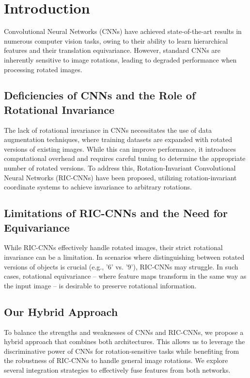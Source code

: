 \section{Introduction}
\label{sec:intro}

Convolutional Neural Networks (CNNs) have achieved state-of-the-art results in numerous computer vision tasks, owing to their ability to learn hierarchical features and their translation equivariance. However, standard CNNs are inherently sensitive to image rotations, leading to degraded performance when processing rotated images.

\subsection{Deficiencies of CNNs and the Role of Rotational Invariance}

The lack of rotational invariance in CNNs necessitates the use of data augmentation techniques, where training datasets are expanded with rotated versions of existing images. While this can improve performance, it introduces computational overhead and requires careful tuning to determine the appropriate number of rotated versions. To address this, Rotation-Invariant Convolutional Neural Networks (RIC-CNNs) \cite{mo2022riccnnrotationinvariantcoordinateconvolutional} have been proposed, utilizing rotation-invariant coordinate systems to achieve invariance to arbitrary rotations.

\subsection{Limitations of RIC-CNNs and the Need for Equivariance}

While RIC-CNNs effectively handle rotated images, their strict rotational invariance can be a limitation. In scenarios where distinguishing between rotated versions of objects is crucial (e.g., '6' vs. '9'), RIC-CNNs may struggle. In such cases, rotational equivariance – where feature maps transform in the same way as the input image – is desirable to preserve rotational information.

\subsection{Our Hybrid Approach}
To balance the strengths and weaknesses of CNNs and RIC-CNNs, we propose a hybrid approach that combines both architectures. This allows us to leverage the discriminative power of CNNs for rotation-sensitive tasks while benefiting from the robustness of RIC-CNNs to handle general image rotations. We explore several integration strategies to effectively fuse features from both networks.

